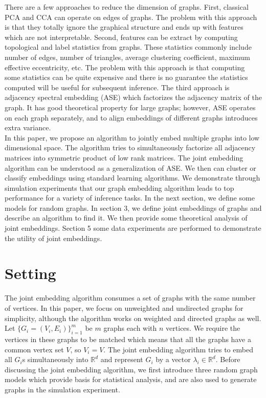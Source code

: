 \documentclass[10pt,journal,compsoc]{IEEEtran}
\begin{document}
\noindent There are a few approaches to reduce the dimension of graphs. First, classical PCA and CCA can operate on edges of graphs. The problem with this approach is that they totally ignore the graphical structure and ends up with features which are not interpretable. Second, features can be extract by computing topological and label statistics from graphs. These statistics commonly include number of edges, number of triangles, average clustering coefficient, maximum effective eccentricity, etc. The problem with this approach is that computing some statistics can be quite expensive and  there is no guarantee the statistics computed will be useful for subsequent inference. The third approach is adjacency spectral embedding (ASE) which factorizes the adjacency matrix of the graph. It has good theoretical property for large graphs; however, ASE operates on each graph separately, and to align embeddings of different graphs introduces extra variance. \\

\noindent In this paper, we propose an algorithm to jointly embed multiple graphs into low dimensional space. The algorithm tries to simultaneously  factorize all adjacency matrices into symmetric product of low rank matrices. The joint embedding algorithm can be understood as a generalization of ASE. We then can cluster or classify embeddings using standard learning algorithms. We demonstrate through simulation experiments that our graph embedding algorithm leads to top performance for a variety of inference tasks. In the next section, we define some models for random graphs. In section 3, we define joint embeddings of graphs and describe an algorithm to find it. We then provide some theoretical analysis of joint embeddings. Section 5 some data experiments are performed to demonstrate the utility of joint embeddings.

\section{Setting}

The joint embedding algorithm consumes a set of graphs with the same number of vertices. In this paper, we focus on unweighted and undirected graphs for simplicity, although the algorithm works on weighted and directed graphs as well. Let $\{G_i=(V_i,E_i)\} _{i=1}^{m}$ be $m$ graphs each with $n$ vertices. We require the vertices in these graphs to be matched which means that all the graphs have a common vertex set $V$, so $V_i=V$. The joint embedding algorithm tries to embed all $G_i$s simultaneously into $\mathbb{R}^d$ and represent $G_i$  by a vector $\lambda_i \in \mathbb{R}^d$. Before discussing the joint embedding algorithm, we first introduce three random graph models which provide basis for statistical analysis, and are also used to generate graphs in the simulation experiment.
\end{document}

